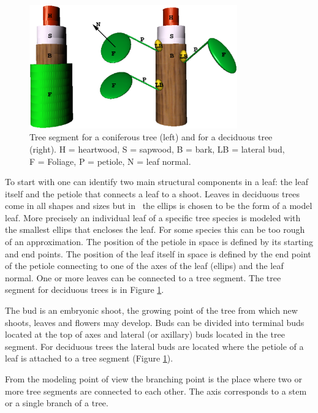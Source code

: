 \begin{figure}[h]
\begin{center}
\includegraphics[width=0.8\textwidth,height=0.5\textwidth]{lignum-segment.eps}
\caption{\label{fig:segment} Tree segment for a coniferous tree (left) and
for a deciduous tree (right). H = heartwood, S =
sapwood, B = bark, LB = lateral bud, F = Foliage, P = petiole, N = leaf normal.}
\end{center}

\end{figure}
To start  with one  can identify two  main structural  components in a
leaf: the leaf itself and the petiole that connects a leaf to a shoot.
Leaves in deciduous trees come in all shapes and sizes but in \lignum\
the ellips is chosen to  be the form of a  model leaf.  More precisely
an individual leaf of a   specific tree species   is modeled with  the
smallest ellips that encloses the leaf.  For  some species this can be
too rough of  an approximation.  The position  of the petiole in space
is defined by  its starting and end  points.  The position of the leaf
itself in space is defined by the end  point of the petiole connecting
to one of the axes of the  leaf (ellips) and the  leaf normal.  One or
more leaves can be connected to a tree segment.   The tree segment for
deciduous trees is in Figure \ref{fig:segment}.

The bud is  an embryonic shoot,  the  growing point  of the  tree from
which new shoots, leaves and flowers may develop.  Buds can be divided
into  terminal buds   located at the   top of  axes  and  lateral  (or
axillary)  buds located in the  tree segment.  For deciduous trees the
lateral buds are located where the petiole of  a leaf is attached to a
tree segment (Figure \ref{fig:segment}).

From the modeling point of view the branching point is the place where
two or more  tree  segments are  connected  to each other.   The  axis
corresponds to a stem or a single branch of a tree.

